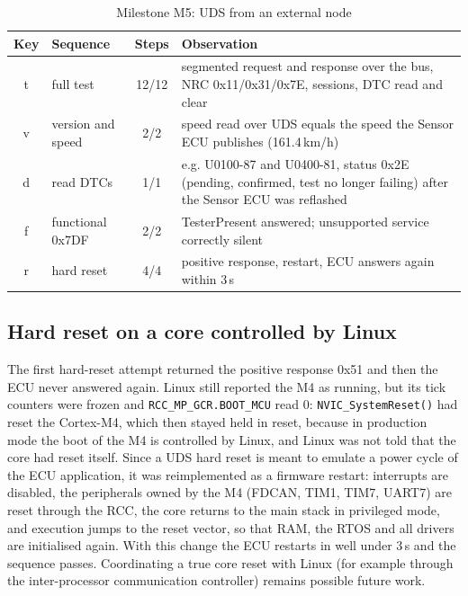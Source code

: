 \begin{table}[H]
\centering
\small
\caption{Milestone M5: UDS from an external node}
\label{tab:m5}
\begin{tabularx}{\textwidth}{@{}clcX@{}}
\toprule
\textbf{Key} & \textbf{Sequence} & \textbf{Steps} & \textbf{Observation} \\
\midrule
t & full test & 12/12 & segmented request and response over the bus, NRC 0x11/0x31/0x7E, sessions, DTC read and clear \\
v & version and speed & 2/2 & speed read over UDS equals the speed the Sensor ECU publishes (161.4\,km/h) \\
d & read DTCs & 1/1 & e.g. U0100-87 and U0400-81, status 0x2E (pending, confirmed, test no longer failing) after the Sensor ECU was reflashed \\
f & functional 0x7DF & 2/2 & TesterPresent answered; unsupported service correctly silent \\
r & hard reset & 4/4 & positive response, restart, ECU answers again within 3\,s \\
\bottomrule
\end{tabularx}
\end{table}

\subsection{Hard reset on a core controlled by Linux}

The first hard-reset attempt returned the positive response 0x51 and then the ECU never answered again. Linux still reported the M4 as running, but its tick counters were frozen and \texttt{RCC\_MP\_GCR.BOOT\_MCU} read 0: \texttt{NVIC\_SystemReset()} had reset the Cortex-M4, which then stayed held in reset, because in production mode the boot of the M4 is controlled by Linux, and Linux was not told that the core had reset itself. Since a UDS hard reset is meant to emulate a power cycle of the ECU application, it was reimplemented as a firmware restart: interrupts are disabled, the peripherals owned by the M4 (FDCAN, TIM1, TIM7, UART7) are reset through the RCC, the core returns to the main stack in privileged mode, and execution jumps to the reset vector, so that RAM, the RTOS and all drivers are initialised again. With this change the ECU restarts in well under 3\,s and the sequence passes. Coordinating a true core reset with Linux (for example through the inter-processor communication controller) remains possible future work.

